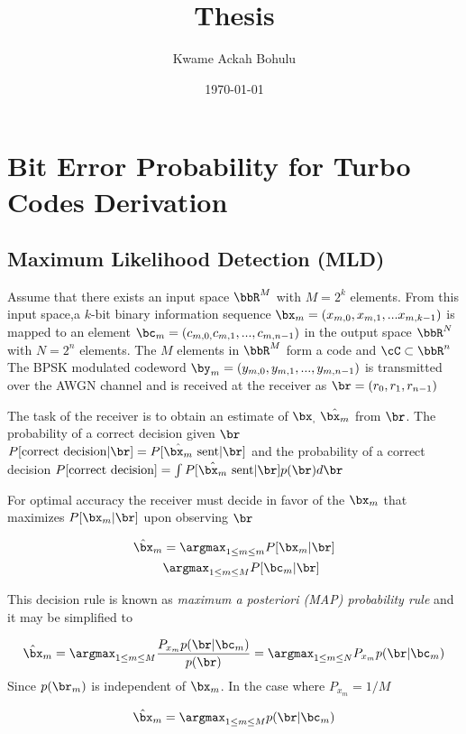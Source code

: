 \documentclass[11pt, oneside, dvipdfmx]{book}
\title{Thesis}
\author{Kwame Ackah Bohulu}
\date{\today}
\begin{document}
\maketitle
\chapter{Bit Error Probability for Turbo Codes Derivation}
\section{Maximum Likelihood Detection (MLD)}
Assume that there exists an input space $\bbR^M$ with $M=2^k $ elements. From this input space,a $k$-bit binary information sequence  $\bx_m =(x_{m,0},x_{m,1},...x_{m,k-1})$ is mapped to  an element $\bc_m =(c_{m,0,}c_{m,1},...,c_{m,n-1} )$ in the output space $\bbR^N$ with $N=2^n$ elements. The $M$ elements in $\bbR^M$ form a code and $\cC \subset \bbR^n$ The BPSK modulated codeword $\by_m=(y_{m,0},y_{m,1},...,y_{m,n-1})$ is transmitted over the AWGN channel and is received at the receiver as $\br =(r_{0},r_{1},r_{n-1})$

The task of the receiver is to obtain an estimate of $\bx_,~\hat{\bx_m}$ from $\br$. The probability of a correct decision given $\br$ $P[\text{correct decision} | \br] = P[\hat{\bx_m}~\text{sent} | \br]$ and the probability of a correct decision 
$P[\text{correct decision} ] = \int P[\hat{\bx_m}~\text{sent} | \br]p(\br) d\br$

For optimal accuracy the receiver must decide in favor of the $\bx_m$ that maximizes $P[\bx_m|\br]$ upon observing $\br$

\begin{equation}
\begin{split}
\hat{\bx}_m& = \argmax_{1 \leq m \leq m} P[\bx_m|\br]\\
& \argmax_{1 \leq m \leq M} P[\bc_m|\br]
\end{split}
\end{equation}

This decision rule is known as \textit{maximum a posteriori (MAP) probability rule} and it may be simplified to

\begin{equation}
\hat{\bx}_m=\argmax_{1 \leq m \leq M}\frac{ P_{x_m}p(\br|\bc_m)}{p(\br)} =\argmax_{1 \leq m \leq N}P_{x_m}p(\br|\bc_m)
\end{equation}
Since $p(\br_m)$ is independent of $\bx_m$. In the case where $P_{x_m}=1/M$


\begin{equation}
\hat{\bx}_m=\argmax_{1 \leq m \leq M}p(\br|\bc_m)
\label{3}
\end{equation}
\end{document}
